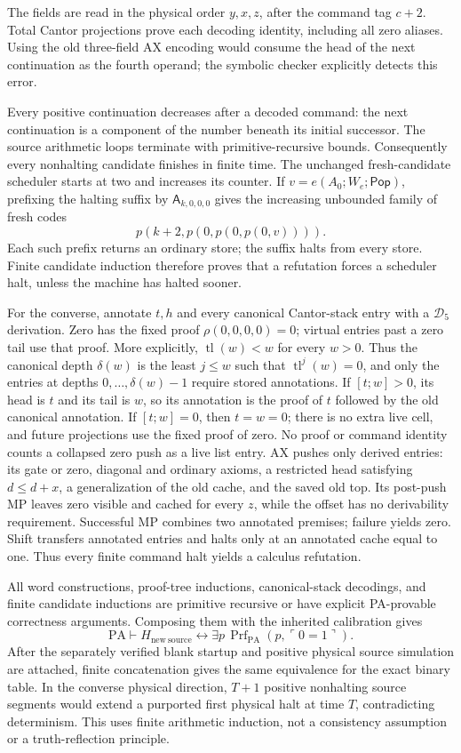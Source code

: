 The fields are read in the physical order $y,x,z$, after the command tag
$c+2$. Total Cantor projections prove each decoding identity, including
all zero aliases. Using the old three-field AX encoding would consume the
head of the next continuation as the fourth operand; the symbolic checker
explicitly detects this error.

Every positive continuation decreases after a decoded command: the next
continuation is a component of the number beneath its initial successor.
The source arithmetic loops terminate with primitive-recursive bounds.
Consequently every nonhalting candidate finishes in finite time. The
unchanged fresh-candidate scheduler starts at two and increases its counter.
If $v=e(A_0;W_e;\mathsf{Pop})$, prefixing the halting suffix by
$\mathsf A_{k,0,0,0}$ gives the increasing unbounded family of fresh codes
\[
                  p(k+2,p(0,p(0,p(0,v)))).
\]
Each such prefix returns an ordinary store; the suffix halts from every
store. Finite candidate induction therefore proves that a refutation
forces a scheduler halt, unless the machine has halted sooner.

For the converse, annotate $t,h$ and every canonical Cantor-stack entry
with a $\mathcal D_5$ derivation. Zero has the fixed proof
$\rho(0,0,0,0)=0$; virtual entries past a zero tail use that proof.
More explicitly, $\operatorname{tl}(w)<w$ for every $w>0$.
Thus the canonical depth $\delta(w)$ is the least $j\le w$ such that
$\operatorname{tl}^{j}(w)=0$, and only the entries at depths
$0,\ldots,\delta(w)-1$ require stored annotations. If $[t;w]>0$,
its head is $t$ and its tail is $w$, so its annotation is the proof of
$t$ followed by the old canonical annotation. If $[t;w]=0$, then
$t=w=0$; there is no extra live cell, and future projections use the
fixed proof of zero. No proof or command identity counts a collapsed
zero push as a live list entry.
AX pushes only derived entries: its gate or zero, diagonal and ordinary
axioms, a restricted head satisfying $d\le d+x$, a generalization of the
old cache, and the saved old top. Its post-push MP leaves zero visible and
cached for every $z$, while the offset has no derivability requirement.
Successful MP combines two annotated premises; failure yields zero.
Shift transfers annotated entries and halts only at an annotated cache
equal to one. Thus every finite command halt yields a calculus refutation.

All word constructions, proof-tree inductions, canonical-stack decodings,
and finite candidate inductions are primitive recursive or have explicit
PA-provable correctness arguments. Composing them with the inherited
calibration gives
\[
 \mathrm{PA}\vdash
 H_{\mathrm{new\ source}}
 \leftrightarrow
 \exists p\,\operatorname{Prf}_{\mathrm{PA}}(p,\ulcorner0=1\urcorner).
\]
After the separately verified blank startup and positive physical source
simulation are attached, finite concatenation gives the same equivalence
for the exact binary table. In the converse physical direction, $T+1$
positive nonhalting source segments would extend a purported first physical
halt at time $T$, contradicting determinism. This uses finite arithmetic
induction, not a consistency assumption or a truth-reflection principle.


